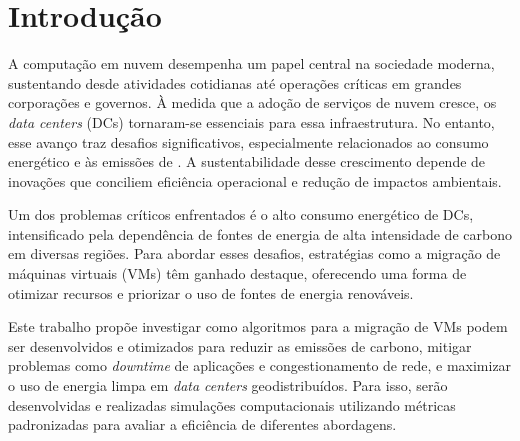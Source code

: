 \documentclass[
	12pt,				%
	oneside,			%
	a4paper,			%
	english,			%
	brazil				%
	]{abntex2ppgsi}
\begin{document}
\tableofcontents*
\cleardoublepage



\textual



% 
%
%
\chapter{Introdução}
A computação em nuvem desempenha um papel central na sociedade moderna, sustentando desde atividades cotidianas até operações críticas em grandes corporações e governos. À medida que a adoção de serviços de nuvem cresce, os \textit{data centers} (DCs) tornaram-se essenciais para essa infraestrutura. No entanto, esse avanço traz desafios significativos, especialmente relacionados ao consumo energético e às emissões de . A sustentabilidade desse crescimento depende de inovações que conciliem eficiência operacional e redução de impactos ambientais.

Um dos problemas críticos enfrentados é o alto consumo energético de DCs, intensificado pela dependência de fontes de energia de alta intensidade de carbono em diversas regiões. Para abordar esses desafios, estratégias como a migração de máquinas virtuais (VMs) têm ganhado destaque, oferecendo uma forma de otimizar recursos e priorizar o uso de fontes de energia renováveis.

Este trabalho propõe investigar como algoritmos para a migração de VMs podem ser desenvolvidos e otimizados para reduzir as emissões de carbono, mitigar problemas como \textit{downtime} de aplicações e congestionamento de rede, e maximizar o uso de energia limpa em \textit{data centers} geodistribuídos. Para isso, serão desenvolvidas e realizadas simulações computacionais utilizando métricas padronizadas para avaliar a eficiência de diferentes abordagens.
\end{document}
